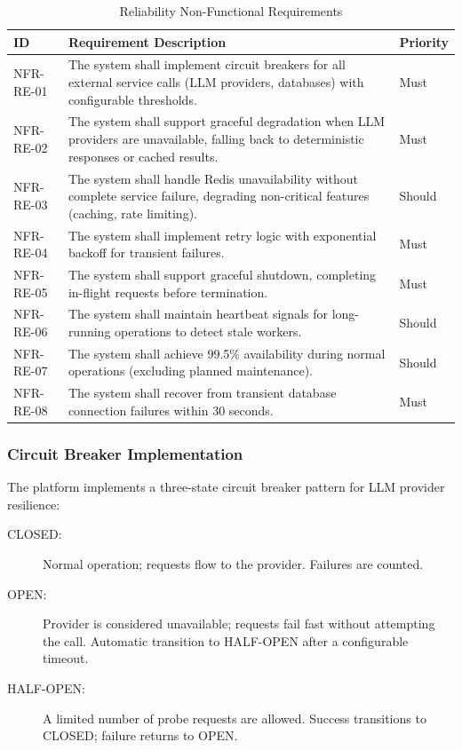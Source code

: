 \documentclass[a4paper,twoside]{sapthesis}
\begin{document}
\begin{table}[htbp]
\centering
\caption{Reliability Non-Functional Requirements}
\label{tab:nfr-reliability}
\small
\begin{tabularx}{\textwidth}{|l|X|l|}
\hline
\textbf{ID} & \textbf{Requirement Description} & \textbf{Priority} \\
\midrule
NFR-RE-01 & The system shall implement circuit breakers for all external service calls (LLM providers, databases) with configurable thresholds. & Must \\
\midrule
NFR-RE-02 & The system shall support graceful degradation when LLM providers are unavailable, falling back to deterministic responses or cached results. & Must \\
\midrule
NFR-RE-03 & The system shall handle Redis unavailability without complete service failure, degrading non-critical features (caching, rate limiting). & Should \\
\midrule
NFR-RE-04 & The system shall implement retry logic with exponential backoff for transient failures. & Must \\
\midrule
NFR-RE-05 & The system shall support graceful shutdown, completing in-flight requests before termination. & Must \\
\midrule
NFR-RE-06 & The system shall maintain heartbeat signals for long-running operations to detect stale workers. & Should \\
\midrule
NFR-RE-07 & The system shall achieve 99.5\% availability during normal operations (excluding planned maintenance). & Should \\
\midrule
NFR-RE-08 & The system shall recover from transient database connection failures within 30 seconds. & Must \\
\midrule
\end{tabularx}
\end{table}

\subsubsection{Circuit Breaker Implementation}

The platform implements a three-state circuit breaker pattern for LLM provider resilience:

\begin{description}
    \item[CLOSED:] Normal operation; requests flow to the provider. Failures are counted.
    \item[OPEN:] Provider is considered unavailable; requests fail fast without attempting the call. Automatic transition to HALF-OPEN after a configurable timeout.
    \item[HALF-OPEN:] A limited number of probe requests are allowed. Success transitions to CLOSED; failure returns to OPEN.
\end{description}
\end{document}
